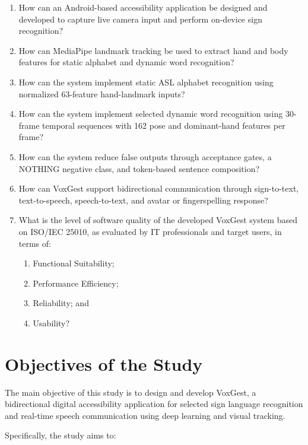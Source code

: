 \renewcommand{\labelenumii}{\arabic{enumi}.\arabic{enumii}}
\begin{enumerate}
    \item How can an Android-based accessibility application be designed and developed to capture live camera input and perform on-device sign recognition?
    \item How can MediaPipe landmark tracking be used to extract hand and body features for static alphabet and dynamic word recognition?
    \item How can the system implement static ASL alphabet recognition using normalized 63-feature hand-landmark inputs?
    \item How can the system implement selected dynamic word recognition using 30-frame temporal sequences with 162 pose and dominant-hand features per frame?
    \item How can the system reduce false outputs through acceptance gates, a NOTHING negative class, and token-based sentence composition?
    \item How can VoxGest support bidirectional communication through sign-to-text, text-to-speech, speech-to-text, and avatar or fingerspelling response?
    \item What is the level of software quality of the developed VoxGest system based on ISO/IEC 25010, as evaluated by IT professionals and target users, in terms of:
    \begin{enumerate}
        \item Functional Suitability;
        \item Performance Efficiency;
        \item Reliability; and
        \item Usability?
    \end{enumerate}
\end{enumerate}

\section{Objectives of the Study}

The main objective of this study is to design and develop VoxGest, a bidirectional digital accessibility application for selected sign language recognition and real-time speech communication using deep learning and visual tracking.

Specifically, the study aims to:

